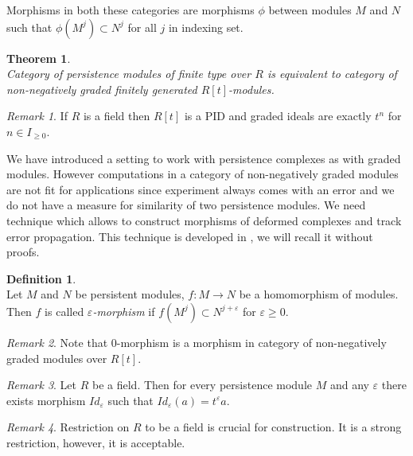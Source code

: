 \documentclass[a4paper, 12pt]{article}
\newtheorem{theorem}{Theorem}
\theoremstyle{definition}
\newtheorem{definition}{Definition}
\theoremstyle{remark}
\newtheorem{remark}{Remark}
\newcommand{\define}[1]{{\textit{#1}}}
\begin{document}
Morphisms in both these categories are morphisms $\phi$ between modules $M$ and $N$ such that $\phi(M^j) \subset N^j$ for all $j$ in indexing set.\\

\begin{theorem} {\cite[Theorem 3.1]{Zomorodian05}}\\
  Category of persistence modules of finite type over $R$ is equivalent to category of non-negatively graded finitely generated $R[t]$-modules.
\end{theorem}

\begin{remark}
  If $R$ is a field then $R[t]$ is a PID and graded ideals are exactly $t^n$ for $n \in I_{\geq 0}$.
\end{remark}


We have introduced a setting to work with persistence complexes as with graded modules. However computations in a category of non-negatively graded modules are not fit for applications since experiment always comes with an error and we do not have a measure for similarity of two persistence modules. We need technique which allows to construct morphisms of deformed complexes and track error propagation. This technique is developed in {\cite{Skraba16}}, we will recall it without proofs.

\begin{definition} {\cite[Definition 2.7]{Skraba16}}\\
  Let $M$ and $N$ be persistent modules, $f : M \to N$ be a homomorphism of modules. Then $f$ is called \define{$\varepsilon$-morphism} if $f(M^j) \subset N^{j+\varepsilon}$ for $\varepsilon \geq 0$.
\end{definition}

\begin{remark}
  Note that $0$-morphism is a morphism in category of non-negatively graded modules over $R[t]$.
\end{remark}

\begin{remark}
  Let $R$ be a field. Then for every persistence module $M$ and any $\varepsilon$ there exists morphism $Id_{\varepsilon}$ such that $Id_{\varepsilon}(a) = t^{\varepsilon}a$.
\end{remark}

\begin{remark}
  Restriction on $R$ to be a field is crucial for construction. It is a strong restriction, however, it is acceptable.
\end{remark}
\end{document}
